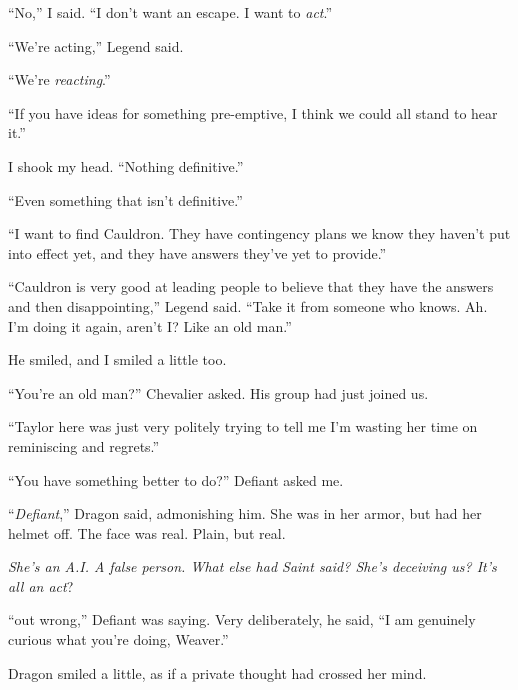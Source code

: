 ``No,'' I said.  ``I don't want an escape.  I want to \emph{act}.''



``We're acting,'' Legend said.



``We're \emph{reacting}.''



``If you have ideas for something pre-emptive, I think we could all stand to hear it.''



I shook my head.  ``Nothing definitive.''



``Even something that isn't definitive.''



``I want to find Cauldron.  They have contingency plans we know they haven't put into effect yet, and they have answers they've yet to provide.''



``Cauldron is very good at leading people to believe that they have the answers and then disappointing,'' Legend said.  ``Take it from someone who knows.  Ah.  I'm doing it again, aren't I?  Like an old man.''



He smiled, and I smiled a little too.



``You're an old man?''  Chevalier asked.  His group had just joined us.



``Taylor here was just very politely trying to tell me I'm wasting her time on reminiscing and regrets.''



``You have something better to do?'' Defiant asked me.



``\emph{Defiant},'' Dragon said, admonishing him.  She was in her armor, but had her helmet off.  The face was real.  Plain, but real.



\emph{She's an A.I.  A false person.  What else had Saint said?  She's deceiving us?  It's all an act}?



``\ldotscame out wrong,'' Defiant was saying.  Very deliberately, he said, ``I am genuinely curious what you're doing, Weaver.''



Dragon smiled a little, as if a private thought had crossed her mind.



